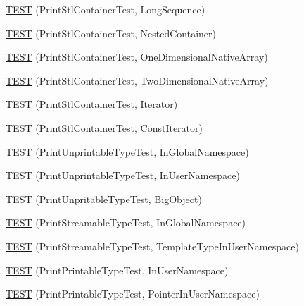 \begin{DoxyCompactItemize}
\item 
\hyperlink{namespacetesting_1_1gtest__printers__test_a55eca253f3365ad26183bcc711cb257a}{\-T\-E\-S\-T} (\-Print\-Stl\-Container\-Test, \-Long\-Sequence)
\item 
\hyperlink{namespacetesting_1_1gtest__printers__test_ad8fb463805baecdfb95154dec6ec4f27}{\-T\-E\-S\-T} (\-Print\-Stl\-Container\-Test, \-Nested\-Container)
\item 
\hyperlink{namespacetesting_1_1gtest__printers__test_a6dd59bbdea483f662fe62e2c55c106ce}{\-T\-E\-S\-T} (\-Print\-Stl\-Container\-Test, \-One\-Dimensional\-Native\-Array)
\item 
\hyperlink{namespacetesting_1_1gtest__printers__test_aca371c218e2248562ed258eaf385f4d1}{\-T\-E\-S\-T} (\-Print\-Stl\-Container\-Test, \-Two\-Dimensional\-Native\-Array)
\item 
\hyperlink{namespacetesting_1_1gtest__printers__test_a01ec32faf0032f9fbcf4895d8d6e4aa9}{\-T\-E\-S\-T} (\-Print\-Stl\-Container\-Test, \-Iterator)
\item 
\hyperlink{namespacetesting_1_1gtest__printers__test_a3b54f9a039804190b7ff2e818169c0f2}{\-T\-E\-S\-T} (\-Print\-Stl\-Container\-Test, \-Const\-Iterator)
\item 
\hyperlink{namespacetesting_1_1gtest__printers__test_a805264fd24de8e65cba977a798abc54c}{\-T\-E\-S\-T} (\-Print\-Unprintable\-Type\-Test, \-In\-Global\-Namespace)
\item 
\hyperlink{namespacetesting_1_1gtest__printers__test_a0aa1499e978bdde6c71e49ecc9db695b}{\-T\-E\-S\-T} (\-Print\-Unprintable\-Type\-Test, \-In\-User\-Namespace)
\item 
\hyperlink{namespacetesting_1_1gtest__printers__test_a6b6fba2a191094244f8aa78a4933a2c5}{\-T\-E\-S\-T} (\-Print\-Unpritable\-Type\-Test, \-Big\-Object)
\item 
\hyperlink{namespacetesting_1_1gtest__printers__test_a80fe9d71227a97b12fd5336a823c3d17}{\-T\-E\-S\-T} (\-Print\-Streamable\-Type\-Test, \-In\-Global\-Namespace)
\item 
\hyperlink{namespacetesting_1_1gtest__printers__test_a8ccd96504d676671a0429073d5012ff1}{\-T\-E\-S\-T} (\-Print\-Streamable\-Type\-Test, \-Template\-Type\-In\-User\-Namespace)
\item 
\hyperlink{namespacetesting_1_1gtest__printers__test_a52f5df394111bcc55aecc59ce426088d}{\-T\-E\-S\-T} (\-Print\-Printable\-Type\-Test, \-In\-User\-Namespace)
\item 
\hyperlink{namespacetesting_1_1gtest__printers__test_a3da6191eff6b016540024c2bfccdd90b}{\-T\-E\-S\-T} (\-Print\-Printable\-Type\-Test, \-Pointer\-In\-User\-Namespace)

\end{DoxyCompactItemize}
